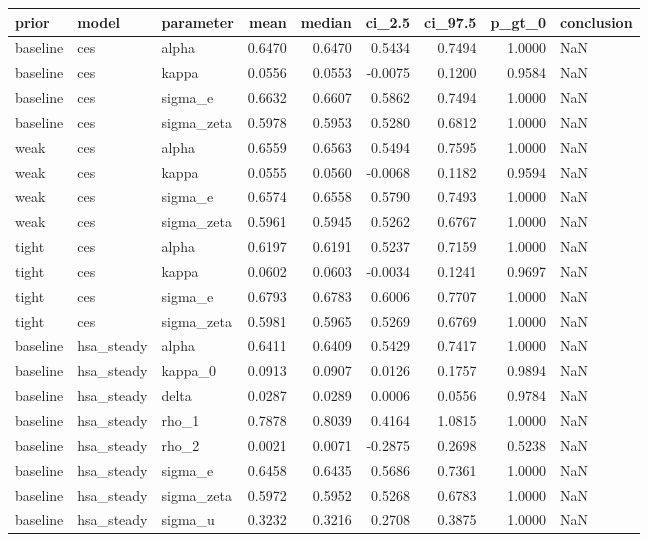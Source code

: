 \begin{tabular}{lllrrrrrl}
\toprule
prior & model & parameter & mean & median & ci\_2.5 & ci\_97.5 & p\_gt\_0 & conclusion \\
\midrule
baseline & ces & alpha & 0.6470 & 0.6470 & 0.5434 & 0.7494 & 1.0000 & NaN \\
baseline & ces & kappa & 0.0556 & 0.0553 & -0.0075 & 0.1200 & 0.9584 & NaN \\
baseline & ces & sigma\_e & 0.6632 & 0.6607 & 0.5862 & 0.7494 & 1.0000 & NaN \\
baseline & ces & sigma\_zeta & 0.5978 & 0.5953 & 0.5280 & 0.6812 & 1.0000 & NaN \\
weak & ces & alpha & 0.6559 & 0.6563 & 0.5494 & 0.7595 & 1.0000 & NaN \\
weak & ces & kappa & 0.0555 & 0.0560 & -0.0068 & 0.1182 & 0.9594 & NaN \\
weak & ces & sigma\_e & 0.6574 & 0.6558 & 0.5790 & 0.7493 & 1.0000 & NaN \\
weak & ces & sigma\_zeta & 0.5961 & 0.5945 & 0.5262 & 0.6767 & 1.0000 & NaN \\
tight & ces & alpha & 0.6197 & 0.6191 & 0.5237 & 0.7159 & 1.0000 & NaN \\
tight & ces & kappa & 0.0602 & 0.0603 & -0.0034 & 0.1241 & 0.9697 & NaN \\
tight & ces & sigma\_e & 0.6793 & 0.6783 & 0.6006 & 0.7707 & 1.0000 & NaN \\
tight & ces & sigma\_zeta & 0.5981 & 0.5965 & 0.5269 & 0.6769 & 1.0000 & NaN \\
baseline & hsa\_steady & alpha & 0.6411 & 0.6409 & 0.5429 & 0.7417 & 1.0000 & NaN \\
baseline & hsa\_steady & kappa\_0 & 0.0913 & 0.0907 & 0.0126 & 0.1757 & 0.9894 & NaN \\
baseline & hsa\_steady & delta & 0.0287 & 0.0289 & 0.0006 & 0.0556 & 0.9784 & NaN \\
baseline & hsa\_steady & rho\_1 & 0.7878 & 0.8039 & 0.4164 & 1.0815 & 1.0000 & NaN \\
baseline & hsa\_steady & rho\_2 & 0.0021 & 0.0071 & -0.2875 & 0.2698 & 0.5238 & NaN \\
baseline & hsa\_steady & sigma\_e & 0.6458 & 0.6435 & 0.5686 & 0.7361 & 1.0000 & NaN \\
baseline & hsa\_steady & sigma\_zeta & 0.5972 & 0.5952 & 0.5268 & 0.6783 & 1.0000 & NaN \\
baseline & hsa\_steady & sigma\_u & 0.3232 & 0.3216 & 0.2708 & 0.3875 & 1.0000 & NaN \\

\end{tabular}
